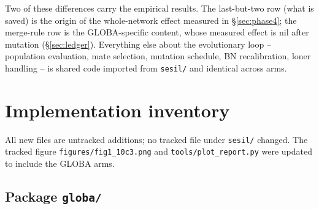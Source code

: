 \documentclass[11pt,a4paper]{article}
\newcommand{\code}[1]{\texttt{#1}}
\begin{document}
Two of these differences carry the empirical results. The last-but-two row (what is saved) is the origin of the whole-network effect measured in \S\ref{sec:phase4}; the merge-rule row is the GLOBA-specific content, whose measured effect is nil after mutation (\S\ref{sec:ledger}). Everything else about the evolutionary loop -- population evaluation, mate selection, mutation schedule, BN recalibration, loner handling -- is shared code imported from \code{sesil/} and identical across arms.

\section{Implementation inventory}
\label{sec:inventory}

All new files are untracked additions; no tracked file under \code{sesil/} changed. The tracked figure \code{figures/fig1\_10c3.png} and \code{tools/plot\_report.py} were updated to include the GLOBA arms.

\subsection{Package \code{globa/}}
\end{document}
